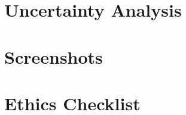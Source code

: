 \documentclass[a4paper,11.5pt]{report}
\numberwithin{figure}{section}
\numberwithin{table}{section}
\numberwithin{equation}{section}
\numberwithin{equation}{section}
\newcommand\blankpage{%
    \null
    \thispagestyle{empty}%
    \addtocounter{page}{-1}%
    \newpage}
\begin{document}
\afterpage{\blankpage}





\appendix
{}
\appendixpage

\renewcommand\chaptername{Appendix}

\newpage
\chapter{Uncertainty Analysis} \label{app:errors}

\chapter{Screenshots} \label{app:screenshots}

\chapter{Ethics Checklist} \label{app:ethicschecklist}
\end{document}
